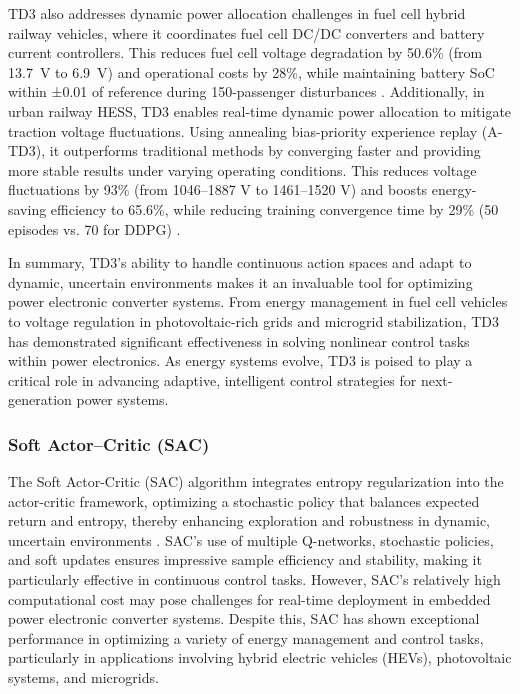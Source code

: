 TD3 also addresses dynamic power allocation challenges in fuel cell hybrid railway vehicles, where it coordinates fuel cell DC/DC converters and battery current controllers. This reduces fuel cell voltage degradation by 50.6\% (from 13.7~\micro V to 6.9~\micro V) and operational costs by 28\%, while maintaining battery SoC within ±0.01 of reference during 150-passenger disturbances \cite{deng2022deep}. Additionally, in urban railway HESS, TD3 enables real-time dynamic power allocation to mitigate traction voltage fluctuations. Using annealing bias-priority experience replay (A-TD3), it outperforms traditional methods by converging faster and providing more stable results under varying operating conditions. This reduces voltage fluctuations by 93\% (from 1046–1887 V to 1461–1520 V) and boosts energy-saving efficiency to 65.6\%, while reducing training convergence time by 29\% (50 episodes vs. 70 for DDPG) \cite{wang2022power}.

In summary, TD3’s ability to handle continuous action spaces and adapt to dynamic, uncertain environments makes it an invaluable tool for optimizing power electronic converter systems. From energy management in fuel cell vehicles to voltage regulation in photovoltaic-rich grids and microgrid stabilization, TD3 has demonstrated significant effectiveness in solving nonlinear control tasks within power electronics. As energy systems evolve, TD3 is poised to play a critical role in advancing adaptive, intelligent control strategies for next-generation power systems.

\subsubsection{Soft Actor–Critic (SAC)}

The Soft Actor-Critic (SAC) algorithm integrates entropy regularization into the actor-critic framework, optimizing a stochastic policy that balances expected return and entropy, thereby enhancing exploration and robustness in dynamic, uncertain environments \cite{haarnoja2018soft}. SAC's use of multiple Q-networks, stochastic policies, and soft updates ensures impressive sample efficiency and stability, making it particularly effective in continuous control tasks. However, SAC’s relatively high computational cost may pose challenges for real-time deployment in embedded power electronic converter systems. Despite this, SAC has shown exceptional performance in optimizing a variety of energy management and control tasks, particularly in applications involving hybrid electric vehicles (HEVs), photovoltaic systems, and microgrids.

